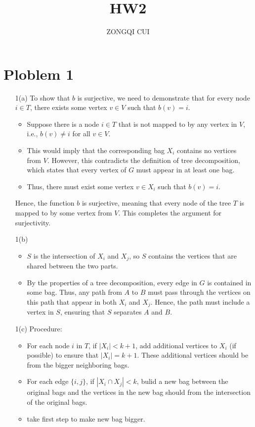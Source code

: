 \documentclass[12pt,letterpaper]{article}
\title{HW2}
\author{ZONGQI CUI}
\begin{document}
\maketitle
\section{Ploblem 1}
    \begin{itemize}
        \item[1(a)]
        To show that $b$ is surjective, we need to demonstrate that for every node $i \in T$, there exists some vertex $v \in V$ such that $b(v) = i$.
            \begin{itemize}
                \item Suppose there is a node $i \in T$ that is not mapped to by any vertex in $V$, i.e., $b(v) \neq i$ for all $v \in V$.
                \item This would imply that the corresponding bag $X_i$ contains no vertices from $V$. However, this contradicts the definition of tree decomposition, which states that every vertex of $G$ must appear in at least one bag.
                \item Thus, there must exist some vertex $v \in X_i$ such that $b(v) = i$.
            \end{itemize}
            Hence, the function $b$ is surjective, meaning that every node of the tree $T$ is mapped to by some vertex from $V$. This completes the argument for surjectivity.
        \item[1(b)]
        
            \begin{itemize}
                \item $S$ is the intersection of $X_i$ and $X_j$, so $S$ contains the vertices that are shared between the two parts.
                \item By the properties of a tree decomposition, every edge in $G$ is contained in some bag. Thus, any path from $A$ to $B$ must pass through the vertices on this path that appear in both $X_i$ and $X_j$. Hence, the path must include a vertex in $S$, ensuring that $S$ separates $A$ and $B$.
            \end{itemize}

        \item[1(c)] 
        Procedure:
        \begin{itemize}
            \item For each node $i$ in $T$, if $|X_i| < k+1$, add additional vertices to $X_i$ (if possible) to ensure that $|X_i| = k+1$. These additional vertices should be from the bigger neighboring bags.
            \item For each edge $\{i,j\}$, if $|X_i \cap X_j| < k$, bulid a new bag between the original bags and the vertices in the new bag should from the intersection of the original bags.  
            \item take first step to make new bag bigger.
        \end{itemize}
    \end{itemize}
\end{document}
